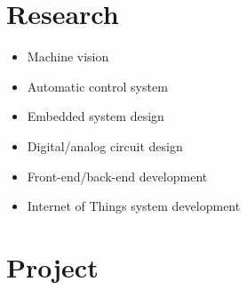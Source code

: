\documentclass{article}
\begin{document}
\section*{Research}
\begin{itemize}
    \item Machine vision
    \item Automatic control system
    \item Embedded system design
    \item Digital/analog circuit design
    \item Front-end/back-end development
    \item Internet of Things system development
\end{itemize}

\section*{Project}
\end{document}

